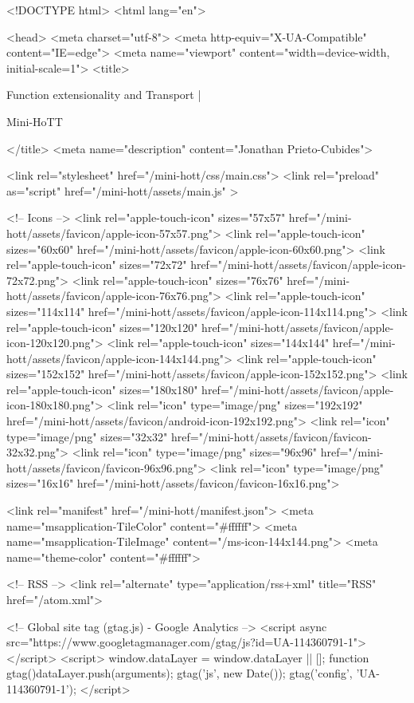 <!DOCTYPE html>
<html lang="en">

<head>
  <meta charset="utf-8">
  <meta http-equiv="X-UA-Compatible" content="IE=edge">
  <meta name="viewport" content="width=device-width, initial-scale=1">
  <title>
    
      
        Function extensionality and Transport |
      
        Mini-HoTT
    
  </title>
  <meta name="description" content="Jonathan Prieto-Cubides">

  <link rel="stylesheet" href="/mini-hott/css/main.css">
  <link rel="preload" as="script" href="/mini-hott/assets/main.js" >

  <!-- Icons -->
  <link rel="apple-touch-icon" sizes="57x57" href="/mini-hott/assets/favicon/apple-icon-57x57.png">
  <link rel="apple-touch-icon" sizes="60x60" href="/mini-hott/assets/favicon/apple-icon-60x60.png">
  <link rel="apple-touch-icon" sizes="72x72" href="/mini-hott/assets/favicon/apple-icon-72x72.png">
  <link rel="apple-touch-icon" sizes="76x76" href="/mini-hott/assets/favicon/apple-icon-76x76.png">
  <link rel="apple-touch-icon" sizes="114x114" href="/mini-hott/assets/favicon/apple-icon-114x114.png">
  <link rel="apple-touch-icon" sizes="120x120" href="/mini-hott/assets/favicon/apple-icon-120x120.png">
  <link rel="apple-touch-icon" sizes="144x144" href="/mini-hott/assets/favicon/apple-icon-144x144.png">
  <link rel="apple-touch-icon" sizes="152x152" href="/mini-hott/assets/favicon/apple-icon-152x152.png">
  <link rel="apple-touch-icon" sizes="180x180" href="/mini-hott/assets/favicon/apple-icon-180x180.png">
  <link rel="icon" type="image/png" sizes="192x192"  href="/mini-hott/assets/favicon/android-icon-192x192.png">
  <link rel="icon" type="image/png" sizes="32x32" href="/mini-hott/assets/favicon/favicon-32x32.png">
  <link rel="icon" type="image/png" sizes="96x96" href="/mini-hott/assets/favicon/favicon-96x96.png">
  <link rel="icon" type="image/png" sizes="16x16" href="/mini-hott/assets/favicon/favicon-16x16.png">

  <link rel="manifest" href="/mini-hott/manifest.json">
  <meta name="msapplication-TileColor" content="#ffffff">
  <meta name="msapplication-TileImage" content="/ms-icon-144x144.png">
  <meta name="theme-color" content="#ffffff">

  <!-- RSS -->
  <link rel="alternate" type="application/rss+xml" title="RSS" href="/atom.xml">

  <!-- Global site tag (gtag.js) - Google Analytics -->
  <script async src="https://www.googletagmanager.com/gtag/js?id=UA-114360791-1"></script>
  <script>
    window.dataLayer = window.dataLayer || [];
    function gtag(){dataLayer.push(arguments);}
    gtag('js', new Date());
    gtag('config', 'UA-114360791-1');
  </script>

